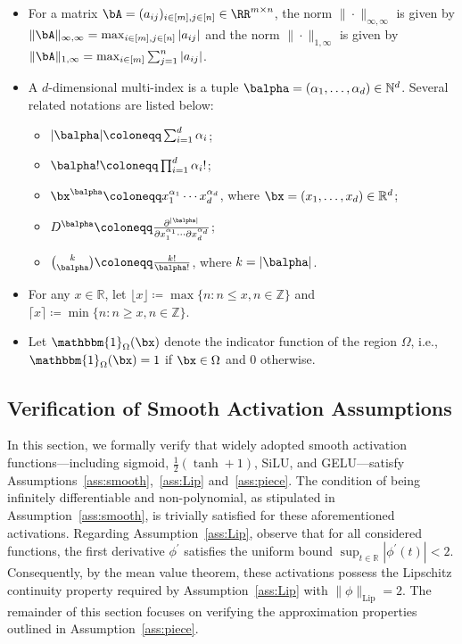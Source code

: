 \documentclass[11pt]{article}
\begin{document}
\begin{itemize}
    \item For a matrix $\bA = (a_{ij})_{i \in[m], j\in [n]}\in \RR^{m \times n}$, the norm $\|\cdot\|_{\infty,\infty}$ is given by $\|\bA\|_{\infty,\infty} = \max_{i \in [m],j \in [n]}  |a_{ij}|$ and the norm $\|\cdot\|_{1, \infty}$ is given by $\|\bA\|_{1, \infty} = \max_{i \in [m]}  \sum_{j=1}^{n} |a_{ij}|$.
    \item A $d$-dimensional multi-index is a tuple $\balpha = (\alpha_1, \dots, \alpha_d) \in \mathbb{N}^d$. Several related notations are listed below:
    \begin{itemize}
        \item $|\balpha| \coloneqq  \sum_{i=1}^d \alpha_i$;
        \item $\balpha! \coloneqq  \prod_{i=1}^d \alpha_i!$;
        \item $\bx^{\balpha} \coloneqq  x_1^{\alpha_1} \cdots x_d^{\alpha_d}$, where $\bx = (x_1, \dots, x_d) \in \mathbb{R}^d$;
        \item $D^{\balpha} \coloneqq  \frac{\partial^{|\balpha|}}{\partial x_1^{\alpha_1} \cdots \partial x_d^{\alpha_d}}$;
        \item $\binom{k}{\balpha} \coloneqq  \frac{k!}{\balpha!}$, where $k = |\balpha|$.
    \end{itemize}
    \item For any $x \in \mathbb{R}$, let $\lfloor x \rfloor \coloneqq  \max\{n : n \le x, n \in \mathbb{Z}\}$ and $\lceil x \rceil \coloneqq  \min\{n : n \ge x, n \in \mathbb{Z}\}$.
    \item Let $\mathbbm{1}_{\Omega}(\bx)$ denote the indicator function of the region $\Omega$, i.e., $\mathbbm{1}_{\Omega}(\bx)=1$ if $\bx \in \Omega$ and $0$ otherwise.
\end{itemize}


\subsection{Verification of Smooth Activation Assumptions}
\label{app:verification}
In this section, we formally verify that widely adopted smooth activation functions---including sigmoid, $\frac{1}{2}(\tanh + 1)$, SiLU, and GELU---satisfy Assumptions~\ref{ass:smooth},~\ref{ass:Lip} and~\ref{ass:piece}. The condition of being infinitely differentiable and non-polynomial, as stipulated in Assumption~\ref{ass:smooth}, is trivially satisfied for these aforementioned activations. Regarding Assumption~\ref{ass:Lip}, observe that for all considered functions, the first derivative $\phi^{\prime}$ satisfies the uniform bound $\sup_{t \in \mathbb{R}} |\phi^{\prime}(t)| < 2$. Consequently, by the mean value theorem, these activations possess the Lipschitz continuity property required by Assumption~\ref{ass:Lip} with $\|\phi\|_{\mathrm{Lip}} = 2$. The remainder of this section focuses on verifying the approximation properties outlined in Assumption~\ref{ass:piece}.
\end{document}
